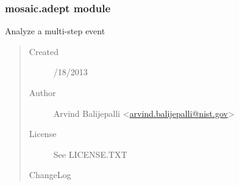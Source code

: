 \documentclass[letterpaper,10pt,english]{sphinxmanual}
\begin{document}
\subsubsection{mosaic.adept module}
\label{api-doc/mosaic.processing:mosaic-adept-module}\label{api-doc/mosaic.processing:module-mosaic.adept}
Analyze a multi-step event
\begin{quote}\begin{description}
\item[{Created}] /18/2013

\item[{Author}] \leavevmode
Arvind Balijepalli \textless{}\href{mailto:arvind.balijepalli@nist.gov}{arvind.balijepalli@nist.gov}\textgreater{}

\item[{License}] \leavevmode
See LICENSE.TXT

\item[{ChangeLog}] \leavevmode
\end{description}\end{quote}
\end{document}
